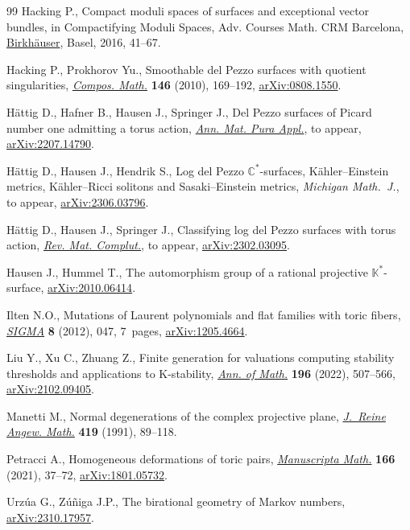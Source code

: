 \documentclass[pdftex]{sigma}
\theoremstyle{definition}
\begin{document}
\begin{thebibliography}{99}
Hacking P., Compact moduli spaces of surfaces and exceptional vector bundles,
 in Compactifying Moduli Spaces, Adv. Courses Math. CRM Barcelona,
 \href{https://doi.org/10.1007/978-3-0348-0921-4_2}{Birkh\"auser}, Basel,
 2016, 41--67.

Hacking P., Prokhorov Yu., Smoothable del {P}ezzo surfaces with quotient
 singularities,
 \href{https://doi.org/10.1112/S0010437X09004370}{\textit{Compos. Math.}}
 \textbf{146} (2010), 169--192,
 \href{http://arxiv.org/abs/0808.1550}{arXiv:0808.1550}.

H\"attig D., Hafner B., Hausen J., Springer J., Del {P}ezzo surfaces of
 {P}icard number one admitting a torus action,
 \href{https://doi.org/10.1007/s10231-025-01552-5}{\textit{Ann. Mat. Pura
 Appl.}}, {t}o appear,
 \href{http://arxiv.org/abs/2207.14790}{arXiv:2207.14790}.

H\"attig D., Hausen J., Hendrik S., Log del Pezzo $\mathbb{C}^*$-surfaces,
 {K}\"ahler--{E}instein metrics, {K}\"ahler--{R}icci solitons and
 {S}asaki--{E}instein metrics, \textit{Michigan Math.~J.}, {t}o appear,
 \href{http://arxiv.org/abs/2306.03796}{arXiv:2306.03796}.

H\"attig D., Hausen J., Springer J., Classifying log del {P}ezzo surfaces with
 torus action, \href{https://doi.org/10.1007/s13163-025-00526-8}{\textit{Rev.
 Mat. Complut.}}, {t}o appear,
 \href{http://arxiv.org/abs/2302.03095}{arXiv:2302.03095}.

Hausen J., Hummel T., The automorphism group of a rational projective
 {$\mathbb{K}^*$}-surface,
 \href{http://arxiv.org/abs/2010.06414}{arXiv:2010.06414}.

Ilten N.O., Mutations of {L}aurent polynomials and flat families with toric
 fibers, \href{https://doi.org/10.3842/SIGMA.2012.047}{\textit{SIGMA}}
 \textbf{8} (2012), 047, 7~pages,
 \href{http://arxiv.org/abs/1205.4664}{arXiv:1205.4664}.

Liu Y., Xu C., Zhuang Z., Finite generation for valuations computing stability
 thresholds and applications to {K}-stability,
 \href{https://doi.org/10.4007/annals.2022.196.2.2}{\textit{Ann. of Math.}}
 \textbf{196} (2022), 507--566,
 \href{http://arxiv.org/abs/2102.09405}{arXiv:2102.09405}.

Manetti M., Normal degenerations of the complex projective plane,
 \href{https://doi.org/10.1515/crll.1991.419.89}{\textit{J.~Reine Angew.
 Math.}} \textbf{419} (1991), 89--118.

Petracci A., Homogeneous deformations of toric pairs,
 \href{https://doi.org/10.1007/s00229-020-01219-w}{\textit{Manuscripta Math.}}
 \textbf{166} (2021), 37--72,
 \href{http://arxiv.org/abs/1801.05732}{arXiv:1801.05732}.

Urz\'ua G., Z\'u\~niga J.P., The birational geometry of {M}arkov numbers,
 \href{http://arxiv.org/abs/2310.17957}{arXiv:2310.17957}.

\end{thebibliography}\LastPageEnding
\end{document}
